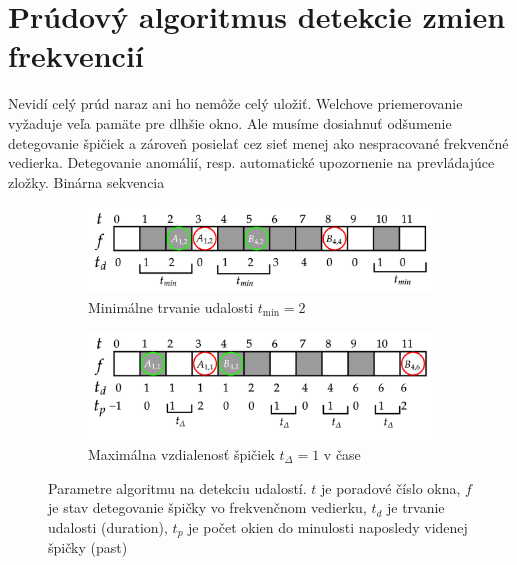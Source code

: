 \section{Prúdový algoritmus detekcie zmien frekvencií}
Nevidí celý prúd naraz ani ho nemôže celý uložiť. Welchove priemerovanie vyžaduje veľa pamäte pre dlhšie okno.
Ale musíme dosiahnuť odšumenie detegovanie špičiek a zároveň posielať cez sieť menej ako nespracované
frekvenčné vedierka. Detegovanie anomálií, resp. automatické upozornenie na prevládajúce zložky.
Binárna sekvencia

\begin{figure}[h]
\centering
\begin{subfigure}[b]{0.8\textwidth}
    \centering
    \includegraphics[width=\textwidth]{figures/design/event-detection-min-duration.png}
    \caption{Minimálne trvanie udalosti $t_{\min} = 2$}
\end{subfigure}
\begin{subfigure}[b]{0.8\textwidth}
    \centering
    \includegraphics[width=\textwidth]{figures/design/event-detection-time-proximity.png}
    \caption{Maximálna vzdialenosť špičiek $t_{\Delta} = 1$ v čase}
\end{subfigure}
\caption{Parametre algoritmu na detekciu udalostí. $t$ je poradové číslo okna, $f$ je stav detegovanie špičky
vo frekvenčnom vedierku, $t_d$ je trvanie udalosti (duration), $t_p$ je počet okien do minulosti naposledy videnej špičky (past)}
\end{figure}

